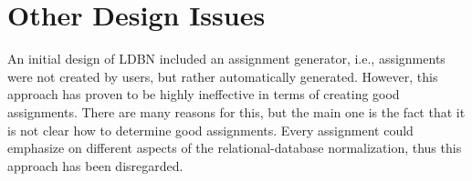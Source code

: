 \section{Other Design Issues}
An initial design of LDBN included an assignment generator, i.e., assignments were not
created by users, but rather automatically generated. However, this approach
has proven to be highly ineffective in terms of creating good assignments. There 
are many reasons for this, but the main one is the fact that it is not clear how
to determine good assignments. Every assignment could emphasize on different aspects of
the relational-database normalization, thus this approach has been disregarded.


